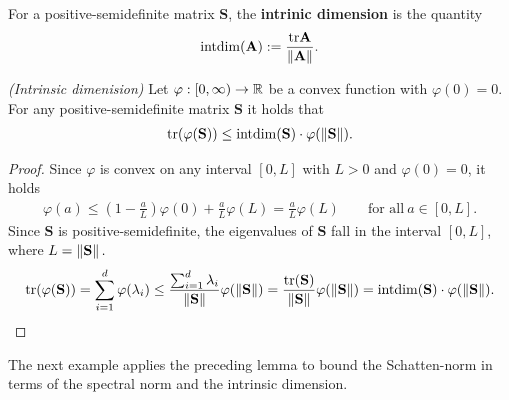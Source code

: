 \begin{definition}
  \label{rmineq_intrinsic_bernstein}
  For a positive-semidefinite matrix $\mathbf{S}$,
  the \textbf{intrinic dimension} is the quantity
  \begin{gather*}
    \mathrm{intdim}
    (\mathbf{A})
    :=
    \frac{\mathrm{tr}\mathbf{A}}{\left\lVert\mathbf{A}\right\rVert}
    .
  \end{gather*}
\end{definition}
\begin{lemma}
  \emph{(Intrinsic dimenision)}
  Let 
  $
    \varphi: [0,\infty) \to \mathbb{R}
  $
  be a convex function with
  $
    \varphi(0)=0.
  $
  For any positive-semidefinite matrix $\mathbf{S}$ it holds that
  \begin{gather*}
    \mathrm{tr}(\varphi(\mathbf{S}))
    \le
    \mathrm{intdim}(\mathbf{S})
    \cdot
    \varphi(\left\lVert\mathbf{S}\right\rVert)
    .
  \end{gather*}
\end{lemma}
\begin{proof}
  \emph{\cite[Lemma~7.5.1]{Tropp2015}}
  Since $\varphi$ is convex on any interval $[0,L]$ with $L>0$ and $\varphi(0)=0$, it holds
  \begin{gather}
    \varphi(a)
    \le
    \left( 
      1 - \frac{a}{L}
    \right)
    \varphi(0)
    +
    \frac{a}{L}
    \varphi(L)
    =
    \frac{a}{L}
    \varphi(L)
    \qquad
    \text{for all}\ 
    a \in [0,L]
    .
  \end{gather}
  Since $\mathbf{S}$ is positive-semidefinite, the eigenvalues of $\mathbf{S}$ 
  fall in the interval $[0,L]$, where $L=\left\lVert\mathbf{S}\right\rVert.$
  \begin{gather}
    \mathrm{tr}(\varphi(\mathbf{S}))
    =
    \sum_{i=1}^{d}
    \varphi(\lambda_i)
    \le
    \frac{
    \sum_{i=1}^{d}
    \lambda_i
    }{\left\lVert\mathbf{S}\right\rVert}
    \varphi(\left\lVert\mathbf{S}\right\rVert)
    =
    \frac{\mathrm{tr}(\mathbf{S})}{\left\lVert\mathbf{S}\right\rVert}
    \varphi(\left\lVert\mathbf{S}\right\rVert)
    =
    \mathrm{intdim}(\mathbf{S})
    \cdot
    \varphi(\left\lVert\mathbf{S}\right\rVert)
    .
  \end{gather}
\end{proof}
The next example applies the preceding lemma to bound the Schatten-norm in terms of the spectral norm and the intrinsic dimension.
